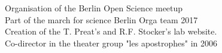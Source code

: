 Organisation of the Berlin Open Science meetup\\
Part of the march for science Berlin Orga team 2017\\
Creation of the T. Preat's and R.F. Stocker's lab website.
\\
Co-director in the theater group "les apostrophes" in
2006


%
%
%
%
%
%
%
%
%
